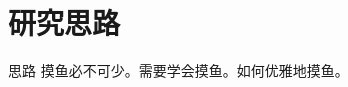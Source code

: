 
\section{研究思路}
\label{sec:idea}

\begin{comment}
全文工作思路，1-2页。理清逻辑，让观众到此明白问题轮廓和自己的工作全貌。
\end{comment}

\begin{frame}{思路}
  摸鱼必不可少。需要学会摸鱼。如何优雅地摸鱼。
\end{frame}

